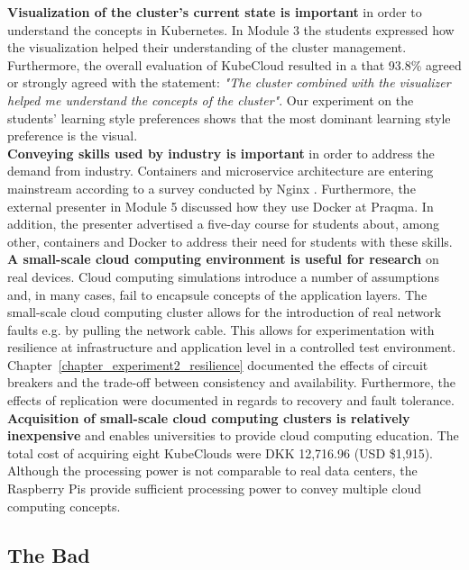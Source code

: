 \noindent
\textbf{Visualization of the cluster's current state is important} in order to understand the concepts in Kubernetes. In Module 3 the students expressed how the visualization helped their understanding of the cluster management. Furthermore, the overall evaluation of KubeCloud resulted in a that 93.8\% agreed or strongly agreed with the statement: \textit{"The cluster combined with the visualizer helped me understand the concepts of the cluster"}. Our experiment on the students' learning style preferences shows that the most dominant learning style preference is the visual.\\

\noindent
\textbf{Conveying skills used by industry is important} in order to address the demand from industry. Containers and microservice architecture are entering mainstream according to a survey conducted by Nginx \cite{nginx2016future}. Furthermore, the external presenter in Module 5 discussed how they use Docker at Praqma. In addition, the presenter advertised a five-day course for students about, among other, containers and Docker to address their need for students with these skills.\\

\noindent
\textbf{A small-scale cloud computing environment is useful for research} on real devices. Cloud computing simulations introduce a number of assumptions and, in many cases, fail to encapsule concepts of the application layers. The small-scale cloud computing cluster allows for the introduction of real network faults e.g. by pulling the network cable. This allows for experimentation with resilience at infrastructure and application level in a controlled test environment. Chapter~\ref{chapter_experiment2_resilience} documented the effects of circuit breakers and the trade-off between consistency and availability. Furthermore, the effects of replication were documented in regards to recovery and fault tolerance. \\

\noindent
\textbf{Acquisition of small-scale cloud computing clusters is relatively inexpensive} and enables universities to provide cloud computing education. The total cost of acquiring eight KubeClouds were DKK 12,716.96 (USD \$1,915). Although the processing power is not comparable to real data centers, the Raspberry Pis provide sufficient processing power to convey multiple cloud computing concepts. 


\subsection*{The Bad}

